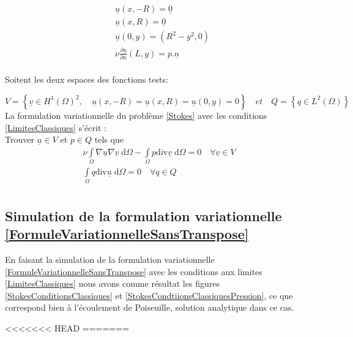 \documentclass[11pt,a4paper]{article}
\numberwithin{equation}{subsection}
\numberwithin{figure}{subsection}
\begin{document}
\begin{equation}
\begin{aligned}
& \underline{u}(x,-R) = \underline{0} \\
& \underline{u}(x, R) = \underline{0} \\
& \underline{u}(0,y) = \left(R^2 - y^2, 0\right) \\
& \nu\frac{\partial\underline{u}}{\partial n}(L,y) = p.\underline{n}\\
\end{aligned} \label{LimitesClassiques}
\end{equation}

Soitent les deux espaces des fonctions tests:

$$V=\left\{\underline{v}\in H^1(\Omega)^2, \quad  \underline{u}(x,-R)=\underline{u}(x, R)=\underline{u}(0,y)=0\right\} \quad et \quad Q=\left\{q\in L^2(\Omega)\right\}$$
La formulation variationnelle du problème \ref{Stokes} avec les conditions \ref{LimitesClassiques} s’écrit :\\
Trouver $\underline{u}\in V $ et $p \in Q $ tels que\\

\begin{equation}
\begin{aligned}
\nu \int\limits_\Omega \nabla \underline{u} \nabla \underline{v} \;\mathrm{d}\Omega - \int\limits_\Omega p \mathrm{div}  \underline{v} \; \mathrm{d}\Omega = 0 \quad \forall \underline{v}\in V\\
\int\limits_\Omega q \mathrm{div} \underline{u} \;\mathrm{d}\Omega = 0 \quad \forall q \in Q\\
\end{aligned}\label{FormuleVariationnelleSansTranspose}
\end{equation}

\subsection{Simulation de la formulation variationnelle \ref{FormuleVariationnelleSansTranspose}}

En faisant la simulation de la formulation variationnelle \ref{FormuleVariationnelleSansTranspose} avec les conditions aux limites \ref{LimitesClassiques} nous avons comme résultat les figures \ref{StokesConditionsClassiques} et \ref{StokesCondtiionsClassiquesPression}, ce que correspond bien à l'écoulement de Poiseuille, solution analytique dans ce cas.

<<<<<<< HEAD
=======
\end{document}

